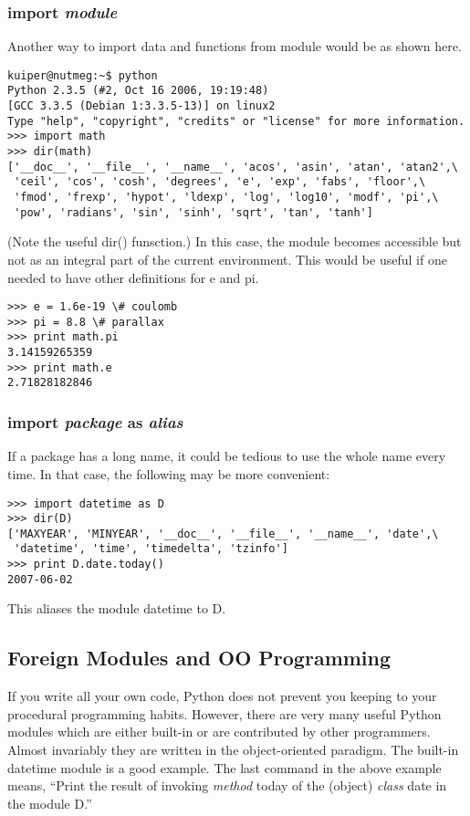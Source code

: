 \documentclass{article}
\begin{document}
\subsubsection{{\ttfamily import {\itshape module}}}

Another way to import data and functions from module would be as shown
here.
\begin{verbatim}
kuiper@nutmeg:~$ python
Python 2.3.5 (#2, Oct 16 2006, 19:19:48)
[GCC 3.3.5 (Debian 1:3.3.5-13)] on linux2
Type "help", "copyright", "credits" or "license" for more information.
>>> import math
>>> dir(math)
['__doc__', '__file__', '__name__', 'acos', 'asin', 'atan', 'atan2',\
 'ceil', 'cos', 'cosh', 'degrees', 'e', 'exp', 'fabs', 'floor',\
 'fmod', 'frexp', 'hypot', 'ldexp', 'log', 'log10', 'modf', 'pi',\
 'pow', 'radians', 'sin', 'sinh', 'sqrt', 'tan', 'tanh']
\end{verbatim}
(Note the useful {\ttfamily dir()} funsction.)
In this case, the module becomes accessible but not as an integral part of the
current environment. 
  This would be useful if one needed to have other
definitions for {\ttfamily e} and {\ttfamily pi}.
\begin{verbatim}
>>> e = 1.6e-19 \# coulomb
>>> pi = 8.8 \# parallax
>>> print math.pi
3.14159265359
>>> print math.e
2.71828182846
\end{verbatim}

\subsubsection{{\ttfamily}import {\itshape package} as {\itshape alias}}

If a package has a long name, it could be tedious to use the whole name every time.
In that case, the following may be more convenient:
\begin{verbatim}
>>> import datetime as D
>>> dir(D)
['MAXYEAR', 'MINYEAR', '__doc__', '__file__', '__name__', 'date',\
 'datetime', 'time', 'timedelta', 'tzinfo']
>>> print D.date.today()
2007-06-02
\end{verbatim}
This aliases the module {\ttfamily datetime} to {\ttfamily D}.

\subsection{Foreign Modules and OO Programming}

If you write all your own code, Python does not prevent you keeping to your
procedural programming habits.  However, there are very many useful Python
modules which are either built-in or are contributed by other programmers.
Almost invariably they are written in the object-oriented paradigm. The built-in
{\ttfamily datetime} module is a good example.  The last command in the
above example means, ``Print the result of invoking {\itshape method}
{\ttfamily today} of the (object) {\itshape class} {\ttfamily date} in the
module {\ttfamily D}.''
\end{document}
